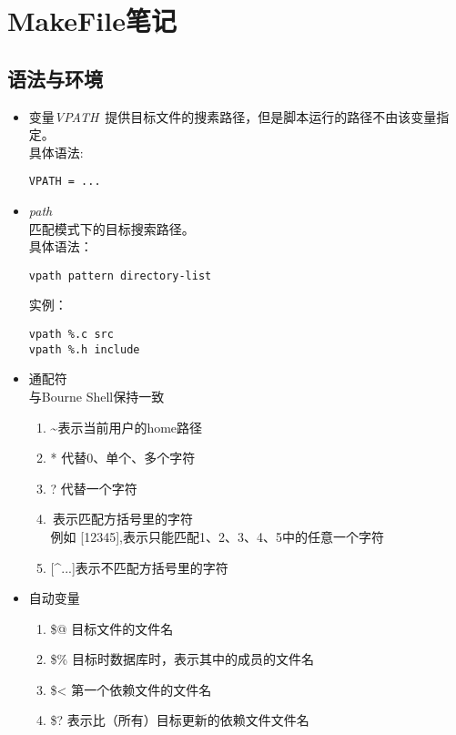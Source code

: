 \section{MakeFile笔记}
  \subsection{语法与环境}
  \begin{itemize}
  	\item 变量\emph{VPATH}\
  		提供目标文件的搜素路径，但是脚本运行的路径不由该变量指定。\\
  		具体语法:
\begin{lstlisting}
VPATH = ...
\end{lstlisting}
	\item \emph{path}\\
	匹配模式下的目标搜索路径。\\
	具体语法：
\begin{lstlisting}
vpath pattern directory-list
\end{lstlisting}
	实例：
\begin{lstlisting}
vpath %.c src
vpath %.h include
\end{lstlisting}
	\item 通配符\\
		与Bourne Shell保持一致
		\begin{enumerate}
			\item \textasciitilde 表示当前用户的home路径
			\item * 代替0、单个、多个字符
			\item ? 代替一个字符
			\item \,\![ ... ]\:表示匹配方括号里的字符\\
				例如 [12345],表示只能匹配1、2、3、4、5中的任意一个字符
			\item {[\textasciicircum...]表示不匹配方括号里的字符}
		\end{enumerate}
	\item 自动变量\\
		\begin{enumerate}
			\item \$@
			目标文件的文件名
			\item \$\%
			目标时数据库时，表示其中的成员的文件名
			\item \$<
			第一个依赖文件的文件名
			\item \$?
			表示比（所有）目标更新的依赖文件文件名

\end{enumerate}
\end{itemize}
